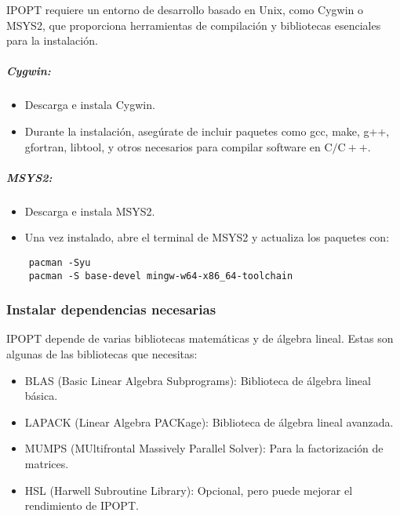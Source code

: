 \begin{flushleft}
	IPOPT requiere un entorno de desarrollo basado en Unix, como Cygwin o MSYS2, que proporciona herramientas de compilación y bibliotecas esenciales para la instalación.
\end{flushleft}

\subparagraph{Cygwin:}

\begin{itemize}
	\item Descarga e instala Cygwin.
	\item Durante la instalación, asegúrate de incluir paquetes como gcc, make, g++, gfortran, libtool, y otros necesarios para compilar software en $\mathrm{C} / \mathrm{C}++$.
\end{itemize}

\subparagraph{MSYS2:}

\begin{itemize}
	\item Descarga e instala MSYS2.
	\item Una vez instalado, abre el terminal de MSYS2 y actualiza los paquetes con:
\end{itemize}

\begin{verbatim}
	pacman -Syu
	pacman -S base-devel mingw-w64-x86_64-toolchain
\end{verbatim}

\subsubsection{Instalar dependencias necesarias}

\begin{flushleft}
	IPOPT depende de varias bibliotecas matemáticas y de álgebra lineal. Estas son algunas de las bibliotecas que necesitas:
\end{flushleft}

\begin{itemize}
	\item BLAS (Basic Linear Algebra Subprograms): Biblioteca de álgebra lineal básica.
	\item LAPACK (Linear Algebra PACKage): Biblioteca de álgebra lineal avanzada.
	\item MUMPS (MUltifrontal Massively Parallel Solver): Para la factorización de matrices.
	\item HSL (Harwell Subroutine Library): Opcional, pero puede mejorar el rendimiento de IPOPT.
\end{itemize}

